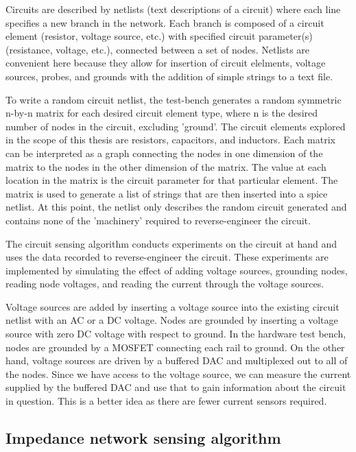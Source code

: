 \documentclass[11pt, a4paper]{article}
\begin{document}
Circuits are described by netlists (text descriptions of a circuit) where each line specifies a new branch in the network.
Each branch is composed of a circuit element (resistor, voltage source, etc.) with specified circuit parameter(s) (resistance, voltage, etc.), connected between a set of nodes.
Netlists are convenient here because they allow for insertion of circuit elelments, voltage sources, probes, and grounds with the addition of simple strings to a text file.

To write a random circuit netlist, the test-bench generates a random symmetric n-by-n matrix for each desired circuit element type, where n is the desired number of nodes in the circuit, excluding 'ground'.
The circuit elements explored in the scope of this thesis are resistors, capacitors, and inductors.
Each matrix can be interpreted as a graph connecting the nodes in one dimension of the matrix to the nodes in the other dimension of the matrix.
The value at each location in the matrix is the circuit parameter for that particular element.  
The matrix is used to generate a list of strings that are then inserted into a spice netlist.
At this point, the netlist only describes the random circuit generated and contains none of the 'machinery' required to reverse-engineer the circuit.

The circuit sensing algorithm conducts experiments on the circuit at hand and uses the data recorded to reverse-engineer the circuit.
These experiments are implemented by simulating the effect of adding voltage sources, grounding nodes, reading node voltages, and reading the current through the voltage sources.

Voltage sources are added by inserting a voltage source into the existing circuit netlist with an AC or a DC voltage.
Nodes are grounded by inserting a voltage source with zero DC voltage with respect to ground.
In the hardware test bench, nodes are grounded by a MOSFET connecting each rail to ground.
On the other hand, voltage sources are driven by a buffered DAC and multiplexed out to all of the nodes.
Since we have access to the voltage source, we can measure the current supplied by the buffered DAC and use that to gain information about the circuit in question.
This is a better idea as there are fewer current sensors required.


\subsection{Impedance network sensing algorithm}
\end{document}
